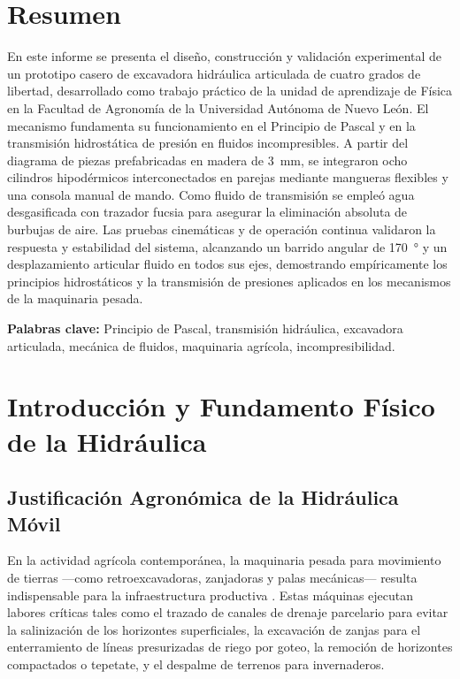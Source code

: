 \section*{Resumen}
En este informe se presenta el diseño, construcción y validación experimental de un prototipo casero de excavadora hidráulica articulada de cuatro grados de libertad, desarrollado como trabajo práctico de la unidad de aprendizaje de Física en la Facultad de Agronomía de la Universidad Autónoma de Nuevo León. El mecanismo fundamenta su funcionamiento en el Principio de Pascal y en la transmisión hidrostática de presión en fluidos incompresibles. A partir del diagrama de piezas prefabricadas en madera de \SI{3}{mm}, se integraron ocho cilindros hipodérmicos interconectados en parejas mediante mangueras flexibles y una consola manual de mando. Como fluido de transmisión se empleó agua desgasificada con trazador fucsia para asegurar la eliminación absoluta de burbujas de aire. Las pruebas cinemáticas y de operación continua validaron la respuesta y estabilidad del sistema, alcanzando un barrido angular de \SI{170}{\degree} y un desplazamiento articular fluido en todos sus ejes, demostrando empíricamente los principios hidrostáticos y la transmisión de presiones aplicados en los mecanismos de la maquinaria pesada.

\vspace{0.3cm}
\noindent\textbf{Palabras clave:} Principio de Pascal, transmisión hidráulica, excavadora articulada, mecánica de fluidos, maquinaria agrícola, incompresibilidad.

\clearpage

\section{Introducción y Fundamento Físico de la Hidráulica}

\subsection{Justificación Agronómica de la Hidráulica Móvil}
En la actividad agrícola contemporánea, la maquinaria pesada para movimiento de tierras ---como retroexcavadoras, zanjadoras y palas mecánicas--- resulta indispensable para la infraestructura productiva \parencite{ortiz2003}. Estas máquinas ejecutan labores críticas tales como el trazado de canales de drenaje parcelario para evitar la salinización de los horizontes superficiales, la excavación de zanjas para el enterramiento de líneas presurizadas de riego por goteo, la remoción de horizontes compactados o tepetate, y el despalme de terrenos para invernaderos.

